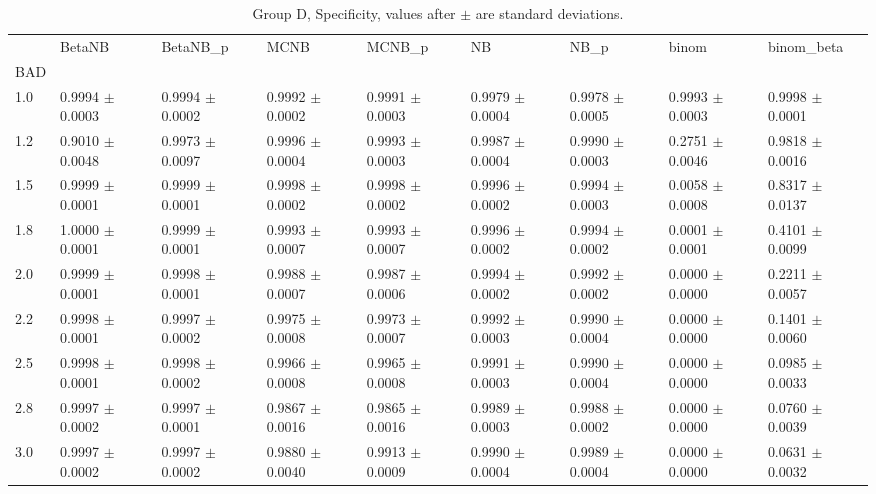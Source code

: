 \begin{table}[H]
\centering
\begin{adjustbox}{max width=\linewidth}
\begin{tabular}{lllllllll}
\toprule
 & BetaNB & BetaNB\_p & MCNB & MCNB\_p & NB & NB\_p & binom & binom\_beta \\
BAD &  &  &  &  &  &  &  &  \\
\midrule
1.0 & 0.9994 $\pm$ 0.0003 & 0.9994 $\pm$ 0.0002 & 0.9992 $\pm$ 0.0002 & 0.9991 $\pm$ 0.0003 & 0.9979 $\pm$ 0.0004 & 0.9978 $\pm$ 0.0005 & 0.9993 $\pm$ 0.0003 & 0.9998 $\pm$ 0.0001 \\
1.2 & 0.9010 $\pm$ 0.0048 & 0.9973 $\pm$ 0.0097 & 0.9996 $\pm$ 0.0004 & 0.9993 $\pm$ 0.0003 & 0.9987 $\pm$ 0.0004 & 0.9990 $\pm$ 0.0003 & 0.2751 $\pm$ 0.0046 & 0.9818 $\pm$ 0.0016 \\
1.5 & 0.9999 $\pm$ 0.0001 & 0.9999 $\pm$ 0.0001 & 0.9998 $\pm$ 0.0002 & 0.9998 $\pm$ 0.0002 & 0.9996 $\pm$ 0.0002 & 0.9994 $\pm$ 0.0003 & 0.0058 $\pm$ 0.0008 & 0.8317 $\pm$ 0.0137 \\
1.8 & 1.0000 $\pm$ 0.0001 & 0.9999 $\pm$ 0.0001 & 0.9993 $\pm$ 0.0007 & 0.9993 $\pm$ 0.0007 & 0.9996 $\pm$ 0.0002 & 0.9994 $\pm$ 0.0002 & 0.0001 $\pm$ 0.0001 & 0.4101 $\pm$ 0.0099 \\
2.0 & 0.9999 $\pm$ 0.0001 & 0.9998 $\pm$ 0.0001 & 0.9988 $\pm$ 0.0007 & 0.9987 $\pm$ 0.0006 & 0.9994 $\pm$ 0.0002 & 0.9992 $\pm$ 0.0002 & 0.0000 $\pm$ 0.0000 & 0.2211 $\pm$ 0.0057 \\
2.2 & 0.9998 $\pm$ 0.0001 & 0.9997 $\pm$ 0.0002 & 0.9975 $\pm$ 0.0008 & 0.9973 $\pm$ 0.0007 & 0.9992 $\pm$ 0.0003 & 0.9990 $\pm$ 0.0004 & 0.0000 $\pm$ 0.0000 & 0.1401 $\pm$ 0.0060 \\
2.5 & 0.9998 $\pm$ 0.0001 & 0.9998 $\pm$ 0.0002 & 0.9966 $\pm$ 0.0008 & 0.9965 $\pm$ 0.0008 & 0.9991 $\pm$ 0.0003 & 0.9990 $\pm$ 0.0004 & 0.0000 $\pm$ 0.0000 & 0.0985 $\pm$ 0.0033 \\
2.8 & 0.9997 $\pm$ 0.0002 & 0.9997 $\pm$ 0.0001 & 0.9867 $\pm$ 0.0016 & 0.9865 $\pm$ 0.0016 & 0.9989 $\pm$ 0.0003 & 0.9988 $\pm$ 0.0002 & 0.0000 $\pm$ 0.0000 & 0.0760 $\pm$ 0.0039 \\
3.0 & 0.9997 $\pm$ 0.0002 & 0.9997 $\pm$ 0.0002 & 0.9880 $\pm$ 0.0040 & 0.9913 $\pm$ 0.0009 & 0.9990 $\pm$ 0.0004 & 0.9989 $\pm$ 0.0004 & 0.0000 $\pm$ 0.0000 & 0.0631 $\pm$ 0.0032 \\
\bottomrule
\end{tabular}

\end{adjustbox}
\caption{Group D, Specificity, values after $\pm$ are standard deviations.}
\end{table}
